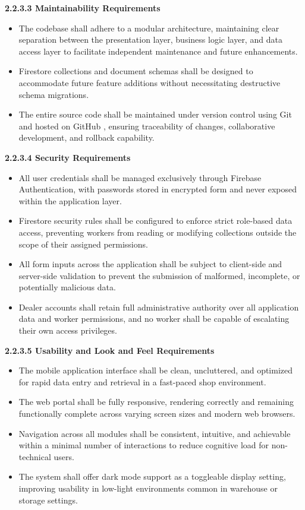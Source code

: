 \documentclass[12pt, oneside]{article}
\begin{document}
\vspace{0.25em}
\textbf{2.2.3.3 Maintainability Requirements}
\begin{itemize}
    \item The codebase shall adhere to a modular architecture, maintaining clear separation between the presentation layer, business logic layer, and data access layer to facilitate independent maintenance and future enhancements.
    \item Firestore collections and document schemas shall be designed to accommodate future feature additions without necessitating destructive schema migrations.
    \item The entire source code shall be maintained under version control using Git and hosted on GitHub \cite{github}, ensuring traceability of changes, collaborative development, and rollback capability.
\end{itemize}

\vspace{0.25em}
\textbf{2.2.3.4 Security Requirements}
\begin{itemize}
    \item All user credentials shall be managed exclusively through Firebase Authentication, with passwords stored in encrypted form and never exposed within the application layer.
    \item Firestore security rules shall be configured to enforce strict role-based data access, preventing workers from reading or modifying collections outside the scope of their assigned permissions.
    \item All form inputs across the application shall be subject to client-side and server-side validation to prevent the submission of malformed, incomplete, or potentially malicious data.
    \item Dealer accounts shall retain full administrative authority over all application data and worker permissions, and no worker shall be capable of escalating their own access privileges.
\end{itemize}

\vspace{0.25em}
\textbf{2.2.3.5 Usability and Look and Feel Requirements}
\begin{itemize}
    \item The mobile application interface shall be clean, uncluttered, and optimized for rapid data entry and retrieval in a fast-paced shop environment.
    \item The web portal shall be fully responsive, rendering correctly and remaining functionally complete across varying screen sizes and modern web browsers.
    \item Navigation across all modules shall be consistent, intuitive, and achievable within a minimal number of interactions to reduce cognitive load for non-technical users.
    \item The system shall offer dark mode support as a toggleable display setting, improving usability in low-light environments common in warehouse or storage settings.
\end{itemize}
\end{document}
